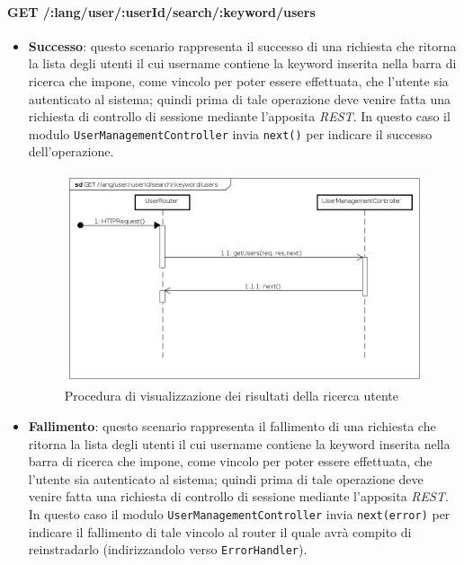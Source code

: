 \paragraph{GET /:lang/user/:userId/search/:keyword/users}
\begin{itemize}
\item \textbf{Successo}: questo scenario rappresenta il successo di una richiesta che ritorna la lista degli utenti il cui username contiene la keyword inserita nella barra di ricerca che impone, come vincolo per poter essere effettuata, che l'utente sia autenticato al sistema; quindi prima di tale operazione deve venire fatta una richiesta di controllo di sessione mediante l'apposita \textit{REST}. In questo caso il modulo \texttt{UserManagementController} invia \texttt{next()} per indicare il successo dell'operazione.

\begin{figure}[ht]
	\centering
	\includegraphics[scale=0.45]{UML/DiagrammiDiSequenza/Back-end/GET__lang_user__userId_search__keyword_users_success.png}
	\caption{Procedura di visualizzazione dei risultati della ricerca utente}
\end{figure}
\FloatBarrier

\item \textbf{Fallimento}: questo scenario rappresenta il fallimento di una richiesta che ritorna la lista degli utenti il cui username contiene la keyword inserita nella barra di ricerca che impone, come vincolo per poter essere effettuata, che l'utente sia autenticato al sistema; quindi prima di tale operazione deve venire fatta una richiesta di controllo di sessione mediante l'apposita \textit{REST}. In questo caso il modulo \texttt{UserManagementController} invia \texttt{next(error)} per indicare il fallimento di tale vincolo al router il quale avrà compito di reinstradarlo (indirizzandolo verso \texttt{ErrorHandler}).


\end{itemize}
